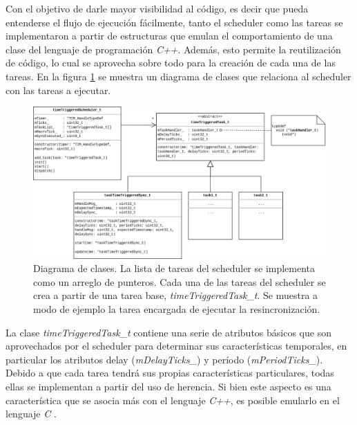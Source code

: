 Con el objetivo de darle mayor visibilidad al código, es decir que pueda entenderse el flujo de ejecución fácilmente, tanto el scheduler como las tareas se implementaron a partir de estructuras que emulan el comportamiento de una clase del lenguaje de programación \textit{C++}. Además, esto permite la reutilización de código, lo cual se aprovecha sobre todo para la creación de cada una de las tareas. En la figura \ref{fig:class_diagram} se muestra un diagrama de clases que relaciona al scheduler con las tareas a ejecutar. %



\begin{figure}[H]
    \centering
    \includegraphics[width=\textwidth]{img/class_diagram.png}
    \caption{Diagrama de clases. La lista de tareas del scheduler se implementa como un arreglo de punteros. Cada una de las tareas del scheduler se crea a partir de una tarea base, \textit{timeTriggeredTask\_t}. Se muestra a modo de ejemplo la tarea encargada de ejecutar la resincronización.}
    \label{fig:class_diagram}
\end{figure}


La clase \textit{timeTriggeredTask\_t} contiene una serie de atributos básicos que son aprovechados por el scheduler para determinar sus características temporales, en particular los atributos delay (\textit{mDelayTicks\_}) y período (\textit{mPeriodTicks\_}). Debido a que cada tarea tendrá sus propias características particulares, todas ellas se implementan a partir del uso de herencia. Si bien este aspecto es una característica que se asocia más con el lenguaje \textit{C++}, es posible emularlo en el lenguaje \textit{C} \cite[p.~32]{samek2008practical}.

